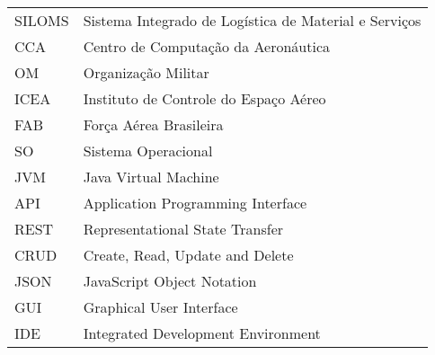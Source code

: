 \begin{longtable}{ll}
SILOMS & Sistema Integrado de Logística de Material e Serviços \\
CCA & Centro de Computação da Aeronáutica \\
OM & Organização Militar \\
ICEA & Instituto de Controle do Espaço Aéreo \\
FAB & Força Aérea Brasileira \\
SO & Sistema Operacional \\
JVM & Java Virtual Machine \\
API & Application Programming Interface \\
REST & Representational State Transfer \\
CRUD & Create, Read, Update and Delete \\
JSON & JavaScript Object Notation \\
GUI & Graphical User Interface \\
IDE & Integrated Development Environment \\

\end{longtable}

